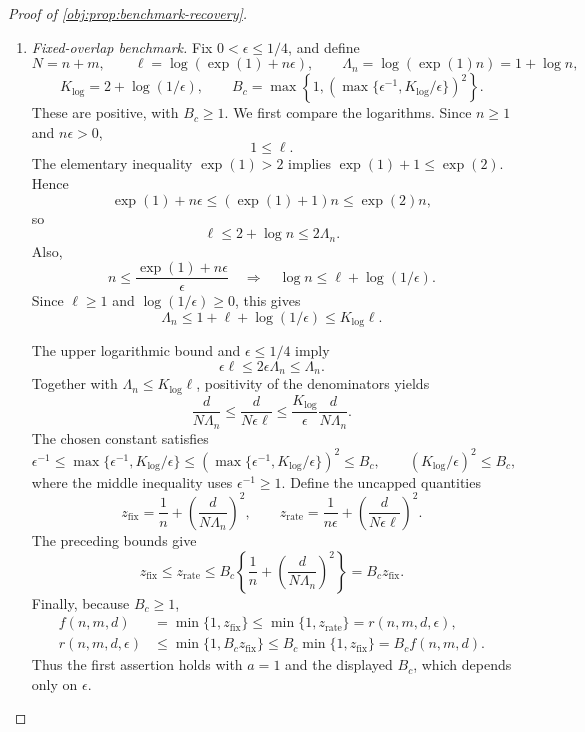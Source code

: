 \begin{proof}[Proof of \cref{obj:prop:benchmark-recovery}]
\begin{enumerate}
\item \emph{Fixed-overlap benchmark.}
Fix \(0<\epsilon\le1/4\), and define
\[
N=n+m,\qquad
\ell=\log(\exp(1)+n\epsilon),\qquad
\Lambda_n=\log(\exp(1)n)=1+\log n,
\]
\[
K_{\log}=2+\log(1/\epsilon),
\qquad
B_c=\max\left\{1,
\left(\max\{\epsilon^{-1},K_{\log}/\epsilon\}\right)^2\right\}.
\]
These are positive, with \(B_c\ge1\). We first compare the logarithms. Since \(n\ge1\) and \(n\epsilon>0\),
\[
1\le\ell.
\]
The elementary inequality \(\exp(1)>2\) implies
\(\exp(1)+1\le\exp(2)\). Hence
\[
\exp(1)+n\epsilon
\le(\exp(1)+1)n
\le\exp(2)n,
\]
so
\[
\ell\le2+\log n\le2\Lambda_n.
\]
Also,
\[
n\le\frac{\exp(1)+n\epsilon}{\epsilon}
\quad\Longrightarrow\quad
\log n\le\ell+\log(1/\epsilon).
\]
Since \(\ell\ge1\) and \(\log(1/\epsilon)\ge0\), this gives
\[
\Lambda_n
\le1+\ell+\log(1/\epsilon)
\le K_{\log}\ell.
\]

The upper logarithmic bound and \(\epsilon\le1/4\) imply
\[
\epsilon\ell\le2\epsilon\Lambda_n\le\Lambda_n.
\]
Together with \(\Lambda_n\le K_{\log}\ell\), positivity of the denominators yields
\[
\frac d{N\Lambda_n}
\le\frac d{N\epsilon\ell}
\le\frac{K_{\log}}{\epsilon}\frac d{N\Lambda_n}.
\]
The chosen constant satisfies
\[
\epsilon^{-1}
\le\max\{\epsilon^{-1},K_{\log}/\epsilon\}
\le\left(\max\{\epsilon^{-1},K_{\log}/\epsilon\}\right)^2
\le B_c,
\qquad
(K_{\log}/\epsilon)^2\le B_c,
\]
where the middle inequality uses \(\epsilon^{-1}\ge1\). Define the uncapped quantities
\[
z_{\mathrm{fix}}
=\frac1n+\left(\frac d{N\Lambda_n}\right)^2,
\qquad
z_{\mathrm{rate}}
=\frac1{n\epsilon}+\left(\frac d{N\epsilon\ell}\right)^2.
\]
The preceding bounds give
\[
z_{\mathrm{fix}}\le z_{\mathrm{rate}}
\le
B_c\left\{\frac1n+\left(\frac d{N\Lambda_n}\right)^2\right\}
=B_cz_{\mathrm{fix}}.
\]
Finally, because \(B_c\ge1\),
\[
\begin{aligned}
f(n,m,d)
&=\min\{1,z_{\mathrm{fix}}\}
\le\min\{1,z_{\mathrm{rate}}\}
=r(n,m,d,\epsilon),\\
r(n,m,d,\epsilon)
&\le\min\{1,B_cz_{\mathrm{fix}}\}
\le B_c\min\{1,z_{\mathrm{fix}}\}
=B_cf(n,m,d).
\end{aligned}
\]
Thus the first assertion holds with \(a=1\) and the displayed \(B_c\), which depends only on \(\epsilon\).


\end{enumerate}
\end{proof}
